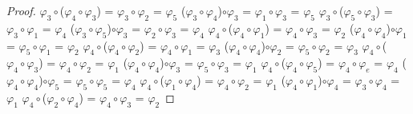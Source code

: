 \documentclass[10pt,a4paper,oneside]{article}
\begin{document}
\begin{proof}
				$\varphi_{3}\circ$($\varphi_{4}\circ\varphi_{3}$) = $\varphi_{3}\circ\varphi_{2}$ = $\varphi_{5}$
				\newline
				($\varphi_{3}\circ\varphi_{4}$)$\circ\varphi_{3}$ = $\varphi_{1}\circ\varphi_{3}$ = $\varphi_{5}$
				\newline
				\newline
				$\varphi_{3}\circ$($\varphi_{5}\circ\varphi_{3}$) = $\varphi_{3}\circ\varphi_{1}$ = $\varphi_{4}$
				\newline
				($\varphi_{3}\circ\varphi_{5}$)$\circ\varphi_{3}$ = $\varphi_{2}\circ\varphi_{3}$ = $\varphi_{4}$
				\newline
				\newline
				$\varphi_{4}\circ$($\varphi_{4}\circ\varphi_{1}$) = $\varphi_{4}\circ\varphi_{3}$ = $\varphi_{2}$
				\newline
				($\varphi_{4}\circ\varphi_{4}$)$\circ\varphi_{1}$ = $\varphi_{5}\circ\varphi_{1}$ = $\varphi_{2}$
				\newline
				\newline
				$\varphi_{4}\circ$($\varphi_{4}\circ\varphi_{2}$) = $\varphi_{4}\circ\varphi_{1}$ = $\varphi_{3}$
				\newline
				($\varphi_{4}\circ\varphi_{4}$)$\circ\varphi_{2}$ = $\varphi_{5}\circ\varphi_{2}$ = $\varphi_{3}$
				\newline
				\newline
				$\varphi_{4}\circ$($\varphi_{4}\circ\varphi_{3}$) = $\varphi_{4}\circ\varphi_{2}$ = $\varphi_{1}$
				\newline
				($\varphi_{4}\circ\varphi_{4}$)$\circ\varphi_{3}$ = $\varphi_{5}\circ\varphi_{3}$ = $\varphi_{1}$
				\newline
				\newline
				$\varphi_{4}\circ$($\varphi_{4}\circ\varphi_{5}$) = $\varphi_{4}\circ\varphi_{e}$ = $\varphi_{4}$
				\newline
				($\varphi_{4}\circ\varphi_{4}$)$\circ\varphi_{5}$ = $\varphi_{5}\circ\varphi_{5}$ = $\varphi_{4}$
				\newline
				\newline
				$\varphi_{4}\circ$($\varphi_{1}\circ\varphi_{4}$) = $\varphi_{4}\circ\varphi_{2}$ = $\varphi_{1}$
				\newline
				($\varphi_{4}\circ\varphi_{1}$)$\circ\varphi_{4}$ = $\varphi_{3}\circ\varphi_{4}$ = $\varphi_{1}$
				\newline
				\newline
				$\varphi_{4}\circ$($\varphi_{2}\circ\varphi_{4}$) = $\varphi_{4}\circ\varphi_{3}$ = $\varphi_{2}$

\end{proof}
\end{document}
